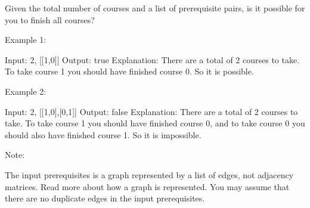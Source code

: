 Given the total number of courses and a list of prerequisite pairs, is it possible for you to finish all courses?

Example 1:

Input: 2, [[1,0]] 
Output: true
Explanation: There are a total of 2 courses to take. 
             To take course 1 you should have finished course 0. So it is possible.

Example 2:

Input: 2, [[1,0],[0,1]]
Output: false
Explanation: There are a total of 2 courses to take. 
             To take course 1 you should have finished course 0, and to take course 0 you should
             also have finished course 1. So it is impossible.

Note:

    The input prerequisites is a graph represented by a list of edges, not adjacency matrices. Read more about how a graph is represented.
    You may assume that there are no duplicate edges in the input prerequisites.


